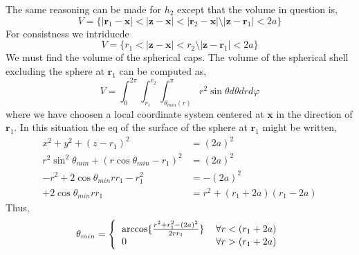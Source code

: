 The same reasoning can be made for $h_2$ except that the volume in question is, 
\begin{equation}
    V = \{
        |\textbf{r}_1 - \textbf{x}| < |\textbf{z} - \textbf{x}| < |\textbf{r}_2 - \textbf{x}|
        \setminus
        |\textbf{z} - \textbf{r}_1| < 2a
    \}
\end{equation}
For consistness we intriducde 
\begin{equation}
    V = \{
        r_1 < |\textbf{z} - \textbf{x}| < r_2
        \setminus
        |\textbf{z} - \textbf{r}_1| < 2a
    \}
\end{equation}
We must find the volume of the spherical caps. 
The volume of the spherical shell excluding the sphere at $\textbf{r}_1$ can be computed as, 
\begin{equation}
    V 
    = 
    \int_0^{2\pi}
    \int_{r_1}^{r_2}
    \int_{\theta_{min}(r)}^{\pi}
    r^2
    \sin\theta
    d\theta 
    dr
    d\varphi
\end{equation}
where we have choosen a local coordinate system centered at $\textbf{x}$ in the direction of $\textbf{r}_1$. 
In this situation the eq of the surface of the sphere at $\textbf{r}_1$ might be written, 
\begin{align}
    x^2
    + y^2
    + (z-r_1)^2
    &= (2a)^2\\
    r^2 \sin^2\theta_{min}
    + (r \cos\theta_{min} -r_1)^2
    &= (2a)^2\\
    - r^2 
    + 2 \cos\theta_{min} r r_1 
    - r_1^2
    &= - (2a)^2\\
    + 2 \cos\theta_{min} r r_1 
    &= 
    r^2 
    + 
    (r_1+2a)(r_1-2a)
\end{align}
Thus, 
\begin{equation}
    \theta_{min}
    = \left\{
    \begin{tabular}{ll}
        $\arccos\{
        \frac{
            r^2 
            + r_1^2
             - (2a)^2
        }{2 r r_1}\}
        $&$
        \forall r < (r_1+2a)$\\
        $ 
        0
        $&$
        \forall r > (r_1+2a)$
    \end{tabular}
    \right.
\end{equation}


